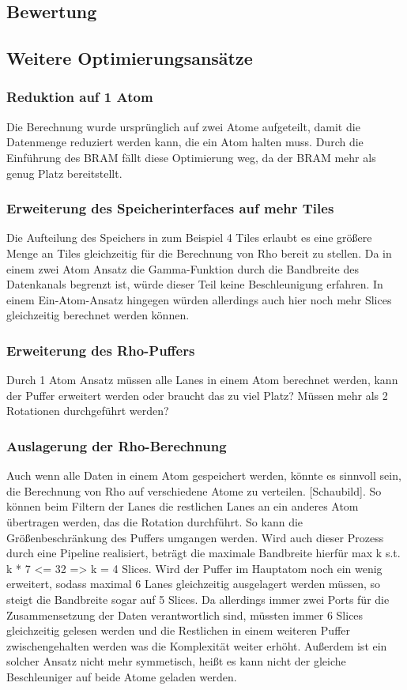 \subsection{Bewertung}

\subsection{Weitere Optimierungsansätze}

\subsubsection{Reduktion auf 1 Atom}
Die Berechnung wurde ursprünglich auf zwei Atome aufgeteilt, damit die Datenmenge reduziert werden kann, die ein Atom halten muss.
Durch die Einführung des BRAM fällt diese Optimierung weg, da der BRAM mehr als genug Platz bereitstellt.

\subsubsection{Erweiterung des Speicherinterfaces auf mehr Tiles}
Die Aufteilung des Speichers in zum Beispiel 4 Tiles erlaubt es eine größere Menge an Tiles gleichzeitig für die Berechnung von Rho bereit zu stellen.
Da in einem zwei Atom Ansatz die Gamma-Funktion durch die Bandbreite des Datenkanals begrenzt ist, würde dieser Teil keine Beschleunigung erfahren.
In einem Ein-Atom-Ansatz hingegen würden allerdings auch hier noch mehr Slices gleichzeitig berechnet werden können.

\subsubsection{Erweiterung des Rho-Puffers}
Durch 1 Atom Ansatz müssen alle Lanes in einem Atom berechnet werden, kann der Puffer erweitert werden oder braucht das zu viel Platz?
Müssen mehr als 2 Rotationen durchgeführt werden?

\subsubsection{Auslagerung der Rho-Berechnung}
Auch wenn alle Daten in einem Atom gespeichert werden, könnte es sinnvoll sein, die Berechnung von Rho auf verschiedene Atome zu verteilen.
[Schaubild]. So können beim Filtern der Lanes die restlichen Lanes an ein anderes Atom übertragen werden, das die Rotation durchführt.
So kann die Größenbeschränkung des Puffers umgangen werden. Wird auch dieser Prozess durch eine Pipeline realisiert, beträgt die maximale Bandbreite hierfür
max k s.t. k * 7 <= 32
=> k = 4 Slices. Wird der Puffer im Hauptatom noch ein wenig erweitert, sodass maximal 6 Lanes gleichzeitig ausgelagert werden müssen, so steigt die Bandbreite sogar
auf 5 Slices. Da allerdings immer zwei Ports für die Zusammensetzung der Daten verantwortlich sind, müssten immer 6 Slices gleichzeitig gelesen werden und die
Restlichen in einem weiteren Puffer zwischengehalten werden was die Komplexität weiter erhöht. Außerdem ist ein solcher Ansatz nicht mehr symmetisch,
heißt es kann nicht der gleiche Beschleuniger auf beide Atome geladen werden.
